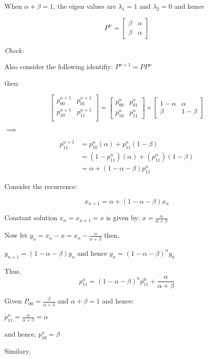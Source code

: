 \documentclass{article}
\begin{document}
When $\alpha+\beta=1$, the eigen values are $\lambda_1=1$ and
$\lambda_2=0$ and hence

\[
P^n = \begin{bmatrix}
\beta & \alpha \\
\beta & \alpha
\end{bmatrix}
\]

\emph{Check:}

Also consider the following identifiy: $P^{n+1}=PP^n$

then:

\[
\begin{bmatrix}
p_{00}^{n+1} & p_{01}^{n+1}\\
p_{10}^{n+1} & p_{11}^{n+1}\\
\end{bmatrix} = \begin{bmatrix} 
p_{00}^n & p_{01}^n\\
p_{10}^n & p_{11}^n
\end{bmatrix} \times \begin{bmatrix}
1-\alpha & \alpha\\
\beta & 1-\beta
\end{bmatrix}
\]

$\implies$

\[
\begin{align}
p_{11}^{n+1} &= p_{10}^n(\alpha) + p_{11}^n(1-\beta)\\
 &= (1-p_{11}^n)(\alpha) +(p_{11}^n)(1-\beta)\\
 &= \alpha + (1-\alpha-\beta)p_{11}^n
\end{align}
\]

Consider the recurrence:

\[
x_{n+1} = \alpha+(1-\alpha-\beta)x_n
\]

Constant solution $x_n=x_{n+1}=x$ is given by:
$x=\frac{\alpha}{\alpha+\beta}$

Now let $y_n = x_n-x=x_n-\frac{\alpha}{\alpha+\beta}$ then,

$y_{n+1} = (1-\alpha-\beta)y_n$ and hence $y_n=(1-\alpha-\beta)^n y_0$

Thus,
\[p_{11}^{n} = (1-\alpha-\beta)^np_{11}^0 +\frac{\alpha}{\alpha+\beta}\]

Given $P_{00}=\frac{\beta}{\alpha+\beta}$ and $\alpha+\beta=1$ and
hence:

$p_{11}^n = \frac{\alpha}{\alpha+\beta} = \alpha$

and hence, $p_{10}^n = \beta$

Similary,
\end{document}
